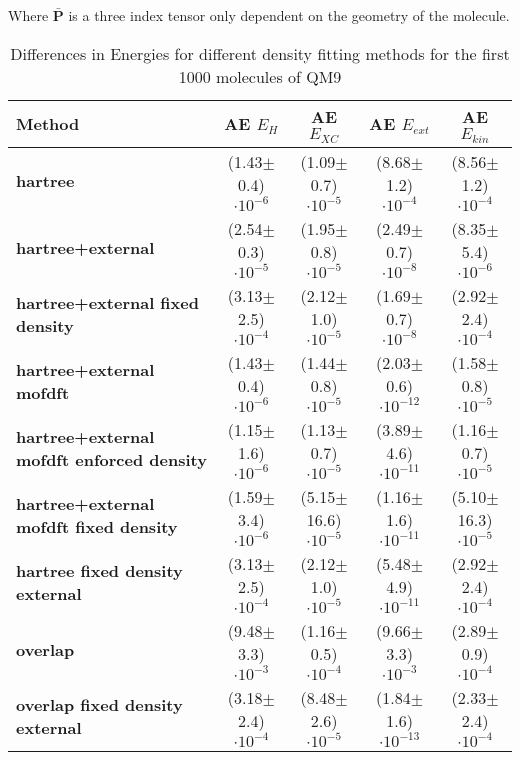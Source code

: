 Where $\bar{\mathbf{P}}$ is a three index tensor only dependent on the geometry of the molecule.
\begin{table}[ht]
\centering
\begin{tabular}{p{3.5cm}|c|c|c|c}
\textbf{Method} & \textbf{AE $E_H$} & \textbf{AE $E_{XC}$} & \textbf{AE $E_{ext}$} & \textbf{AE $E_{kin}$} \\
\hline
\raggedright \textbf{hartree} & (1.43$\pm$0.4)$\cdot 10^{-6}$ & (1.09$\pm$0.7)$\cdot 10^{-5}$ & (8.68$\pm$1.2)$\cdot 10^{-4}$ & (8.56$\pm$1.2)$\cdot 10^{-4}$ \\
\raggedright \textbf{hartree+external} & (2.54$\pm$0.3)$\cdot 10^{-5}$ & (1.95$\pm$0.8)$\cdot 10^{-5}$ & (2.49$\pm$0.7)$\cdot 10^{-8}$ & (8.35$\pm$5.4)$\cdot 10^{-6}$ \\
\raggedright \textbf{hartree+external fixed density} & (3.13$\pm$2.5)$\cdot 10^{-4}$ & (2.12$\pm$1.0)$\cdot 10^{-5}$ & (1.69$\pm$0.7)$\cdot 10^{-8}$ & (2.92$\pm$2.4)$\cdot 10^{-4}$ \\
\raggedright \textbf{hartree+external mofdft} & (1.43$\pm$0.4)$\cdot 10^{-6}$ & (1.44$\pm$0.8)$\cdot 10^{-5}$ & (2.03$\pm$0.6)$\cdot 10^{-12}$ & (1.58$\pm$0.8)$\cdot 10^{-5}$ \\
\raggedright \textbf{hartree+external mofdft enforced density} & (1.15$\pm$1.6)$\cdot 10^{-6}$ & (1.13$\pm$0.7)$\cdot 10^{-5}$ & (3.89$\pm$4.6)$\cdot 10^{-11}$ & (1.16$\pm$0.7)$\cdot 10^{-5}$ \\
\raggedright \textbf{hartree+external mofdft fixed density} & (1.59$\pm$3.4)$\cdot 10^{-6}$ & (5.15$\pm$16.6)$\cdot 10^{-5}$ & (1.16$\pm$1.6)$\cdot 10^{-11}$ & (5.10$\pm$16.3)$\cdot 10^{-5}$ \\
\raggedright \textbf{hartree fixed density external} & (3.13$\pm$2.5)$\cdot 10^{-4}$ & (2.12$\pm$1.0)$\cdot 10^{-5}$ & (5.48$\pm$4.9)$\cdot 10^{-11}$ & (2.92$\pm$2.4)$\cdot 10^{-4}$ \\
\raggedright \textbf{overlap} & (9.48$\pm$3.3)$\cdot 10^{-3}$ & (1.16$\pm$0.5)$\cdot 10^{-4}$ & (9.66$\pm$3.3)$\cdot 10^{-3}$ & (2.89$\pm$0.9)$\cdot 10^{-4}$ \\
\raggedright \textbf{overlap fixed density external} & (3.18$\pm$2.4)$\cdot 10^{-4}$ & (8.48$\pm$2.6)$\cdot 10^{-5}$ & (1.84$\pm$1.6)$\cdot 10^{-13}$ & (2.33$\pm$2.4)$\cdot 10^{-4}$ \\
\end{tabular}
\caption{Differences in Energies for different density fitting methods for the first 1000 molecules of QM9}
\end{table}

